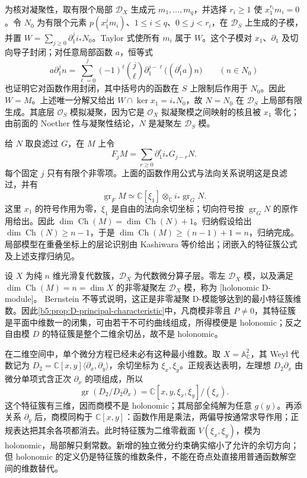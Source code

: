 \begin{proofsketch}
	为核对凝聚性，取有限个局部 \(\mathcal D_X\) 生成元 \(m_1,\ldots,m_q\)，并选择 \(r_i\ge1\) 使 \(x_1^{r_i}m_i=0\)。令 \(N_0\) 为有限个元素 \(p(x_1^jm_i)\)、\(1\le i\le q\)、\(0\le j<r_i\)，在 \(\mathcal D_S\) 上生成的子模，并置 \(W=\sum_{j\ge0}\partial_1^ji_*N_0\)。Taylor 式使所有 \(m_i\) 属于 \(W\)。这个子模对 \(x_1\)、\(\partial_1\) 及切向导子封闭；对任意局部函数 \(a\)，恒等式
	\[
		a\partial_1^jn =\sum_{\ell=0}^j(-1)^\ell\binom{j}{\ell} \partial_1^{j-\ell}\bigl((\partial_1^\ell a)n\bigr) \qquad(n\in N_0)
	\]
	也证明它对函数作用封闭，其中括号内的函数在 \(S\) 上限制后作用于 \(N_0\)。因此 \(W=M\)。上述唯一分解又给出 \(W\cap\ker x_1=i_*N_0\)，故 \(N=N_0\) 在 \(\mathcal D_S\) 上局部有限生成。其底层 \(\mathcal O_S\) 模拟凝聚，因为它是 \(\mathcal O_X\) 拟凝聚模之间映射的核且被 \(x_1\) 零化；由前面的 Noether 性与凝聚性结论，\(N\) 是凝聚左 \(\mathcal D_S\) 模。

	给 \(N\) 取良滤过 \(G\)，在 \(M\) 上令
	\[
		F_jM=\sum_{r\ge0}\partial_1^ri_*G_{j-r}N.
	\]
	每个固定 \(j\) 只有有限个非零项。上面的函数作用公式与法向关系说明这是良滤过，并有
	\[
		\operatorname{gr}_FM\simeq \mathbb C[\xi_1]\otimes_{\mathbb C}i_*\operatorname{gr}_GN.
	\]
	这里 \(x_1\) 的符号作用为零，\(\xi_1\) 是自由的法向余切坐标；切向符号按 \(\operatorname{gr}_GN\) 的原作用给出。因此 \(\dim\operatorname{Ch}(M)=\dim\operatorname{Ch}(N)+1\)。归纳假设给出 \(\dim\operatorname{Ch}(N)\ge n-1\)，于是 \(\dim\operatorname{Ch}(M)\ge(n-1)+1=n\)，归纳完成。局部模型在重叠坐标上的层论识别由 Kashiwara 等价给出；闭嵌入的特征簇公式及上述支撑归纳见\cite[Lemma 2.3.5 and the proof of Corollary 2.3.2, pp. 63--64]{HottaTakeuchiTanisaki2008DModules}。
\end{proofsketch}

设 \(X\) 为纯 \(n\) 维光滑复代数簇，\(\mathcal D_X\) 为代数微分算子层。零左 \(\mathcal D_X\) 模，以及满足 \(\dim\operatorname{Ch}(M)=n=\dim X\) 的非零凝聚左 \(\mathcal D_X\) 模，称为 [holonomic D-module]。 Bernstein 不等式说明，这正是非零凝聚 D-模能够达到的最小特征簇维数。因此\cref{b5:prop:D-principal-characteristic}中，凡商模非零且 \(P\ne0\)，其特征簇是平面中维数一的闭集，可由若干不可约曲线组成，所得模便是 holonomic；反之自由模 \(D\) 的特征簇是整个二维余切丛，故不是 holonomic。

\ProseParagraphBreak
在二维空间中，单个微分方程已经未必有这种最小维数。取 \(X=\mathbb A^2_{\mathbb C}\)，其 Weyl 代数记为 \(D_2=\mathbb C[x,y]\langle\partial_x,\partial_y\rangle\)，余切坐标为 \(\xi_x,\xi_y\)。正规表达表明，左理想 \(D_2\partial_x\) 由微分单项式含正次 \(\partial_x\) 的项组成，所以
\[
	\operatorname{gr}(D_2/D_2\partial_x) =\mathbb C[x,y,\xi_x,\xi_y]/(\xi_x).
\]
这个特征簇有三维，因而商模不是 holonomic；其局部全纯解为任意 \(g(y)\)。再添关系 \(\partial_y\) 后，商模同构于 \(\mathbb C[x,y]\)：函数作用是乘法，两偏导按通常求导作用；正规表达把其余各项都消去。此时特征簇为二维零截面 \(V(\xi_x,\xi_y)\)，模为 holonomic，局部解只剩常数。新增的独立微分约束确实缩小了允许的余切方向；但 holonomic 的定义仍是特征簇的维数条件，不能在奇点处直接用普通函数解空间的维数替代。

